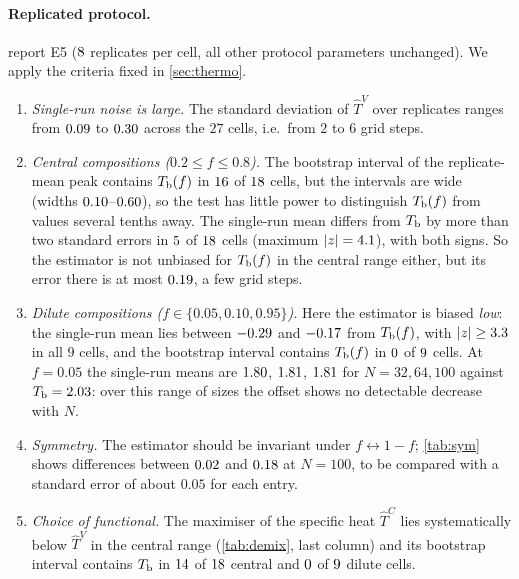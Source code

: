 \paragraph{Replicated protocol.}  report E5 ($8$ replicates per cell, all other protocol parameters unchanged). We apply the criteria fixed in \cref{sec:thermo}.
\begin{enumerate}[label=(\roman*),leftmargin=2em]
\item \emph{Single-run noise is large.} The standard deviation of $\hat T^V$ over replicates ranges from $0.09$ to $0.30$ across the $27$ cells, i.e.\ from $2$ to $6$ grid steps.
\item \emph{Central compositions ($0.2\le f\le0.8$).} The bootstrap interval of the replicate-mean peak contains $T_{\mathrm b}(f)$ in $16$ of $18$ cells, but the intervals are wide (widths $0.10$--$0.60$), so the test has little power to distinguish $T_{\mathrm b}(f)$ from values several tenths away. The single-run mean differs from $T_{\mathrm b}$ by more than two standard errors in $5$ of $18$ cells (maximum $|z|=4.1$), with both signs. So the estimator is not unbiased for $T_{\mathrm b}(f)$ in the central range either, but its error there is at most $0.19$, a few grid steps.
\item \emph{Dilute compositions ($f\in\{0.05,0.10,0.95\}$).} Here the estimator is biased \emph{low}: the single-run mean lies between $-0.29$ and $-0.17$ from $T_{\mathrm b}(f)$, with $|z|\ge3.3$ in all $9$ cells, and the bootstrap interval contains $T_{\mathrm b}(f)$ in $0$ of $9$ cells. At $f=0.05$ the single-run means are $1.80$, $1.81$, $1.81$ for $N=32,64,100$ against $T_{\mathrm b}=2.03$: over this range of sizes the offset shows no detectable decrease with $N$.
\item \emph{Symmetry.} The estimator should be invariant under $f\leftrightarrow1-f$; \cref{tab:sym} shows differences between $0.02$ and $0.18$ at $N=100$, to be compared with a standard error of about $0.05$ for each entry.
\item \emph{Choice of functional.} The maximiser of the specific heat $\hat T^C$ lies systematically below $\hat T^V$ in the central range (\cref{tab:demix}, last column) and its bootstrap interval contains $T_{\mathrm b}$ in $14$ of $18$ central and $0$ of $9$ dilute cells.
\end{enumerate}
